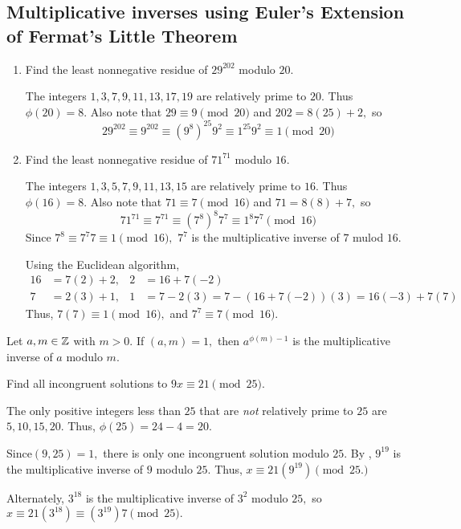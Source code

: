 \documentclass{ximera}
\begin{document}

\subsection*{Multiplicative inverses using Euler's Extension of Fermat's Little Theorem}

\begin{example}\label{ex-euler-solve-cong}
 
  \begin{enumerate}
    \item Find the least nonnegative residue of $29^{202}$ modulo $20$. 
    
    The integers $1,3,7,9,11,13,17,19$ are relatively prime to $20.$ Thus $\phi(20)=8.$ Also note that $29\equiv 9\pmod{20}$ and $202=8(25)+2,$ so 
    \[29^{202}\equiv 9^{202}\equiv(9^8)^{25} 9^2\equiv 1^{25} 9^2\equiv 1\pmod{20}\] 
    
    \item Find the least nonnegative residue of $71^{71}$ modulo $16$.
    
    The integers $1,3,5,7,9,11,13,15$ are relatively prime to $16.$ Thus $\phi(16)=8.$ Also note that $71\equiv 7\pmod{16}$ and $71=8(8)+7,$ so 
      \[71^{71}\equiv 7^{71}\equiv(7^8)^{8} 7^7\equiv 1^{8} 7^7\pmod{16}\] 
      Since $7^8\equiv 7^7 7\equiv 1\pmod{16},$ $7^7$ is the multiplicative inverse of $7$ mulod $16.$

    Using the Euclidean algorithm, 
    \begin{align*}
      16	& = 7(2) + 2,	&2&=16+7(-2)\\
      7	& = 2(3) + 1,	&1&=7-2(3)=7-(16+7(-2))(3)=16(-3)+7(7)
    \end{align*}
    Thus, $7(7)\equiv 1\pmod{16},$ and $7^7\equiv 7\pmod{16}.$
  \end{enumerate}
\end{example}

\begin{corollary}\label{cor:inv-euler}
  Let $a,m\in\mathbb Z$ with $m>0.$  If $(a,m)=1,$ then $a^{\phi(m)-1}$ is the multiplicative inverse of $a$ modulo $m$.
\end{corollary}

\begin{example}
  Find all incongruent solutions to $9x\equiv 21\pmod{25}$.
  
  The only positive integers less than $25$ that are \emph{not} relatively prime to $25$ are $5,10,15,20$. Thus, $\phi(25)=24-4=20.$

  Since$(9,25)=1,$ there is only one  incongruent solution  modulo $25.$ By , $9^{19}$ is the multiplicative inverse of $9$ modulo ${25}$. Thus, $x\equiv 21(9^{19})\pmod{25.}$

  Alternately, $3^{18}$ is the multiplicative inverse of $3^2$ modulo ${25},$ so $x\equiv 21(3^{18})\equiv  (3^{19})7\pmod{25}.$
\end{example}
\end{document}
